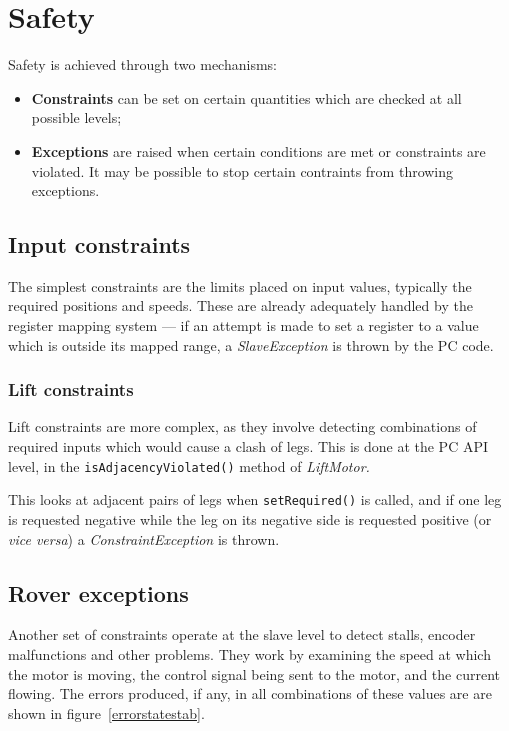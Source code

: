 \section{Safety}
\label{safta}
Safety is achieved through two mechanisms:
\begin{itemize}
\item \textbf{Constraints} can be set on certain quantities
which are checked at all possible levels;
\item \textbf{Exceptions} are raised when certain conditions are met or
constraints are violated. It may be possible to stop certain contraints
from throwing exceptions.
\end{itemize}

\subsection{Input constraints}
The simplest constraints are the limits placed on input values, typically the
required positions and speeds. These are already adequately handled by the
register mapping system --- if an attempt is made to set a register to a value
which is outside its mapped range, a \emph{SlaveException} is thrown by
the PC code.

\subsubsection{Lift constraints}
Lift constraints are more complex, as they involve detecting combinations
of required inputs which would cause a clash of legs. This is done at the PC
API level, in the \texttt{isAdjacencyViolated()} method of \emph{LiftMotor.} 

This looks at adjacent pairs of legs when \texttt{setRequired()} is called,
and if one leg is requested negative
while the leg on its negative side is requested positive (or \emph{vice versa})
a \emph{ConstraintException} is thrown.

\subsection{Rover exceptions}
Another set of constraints operate at the slave level to detect stalls,
encoder malfunctions and other problems. They work by examining the speed at
which the motor is moving, the control signal being sent to the motor, and the
current flowing. The errors produced, if any, in all combinations of these
values are are shown in figure~\ref{errorstatestab}.


